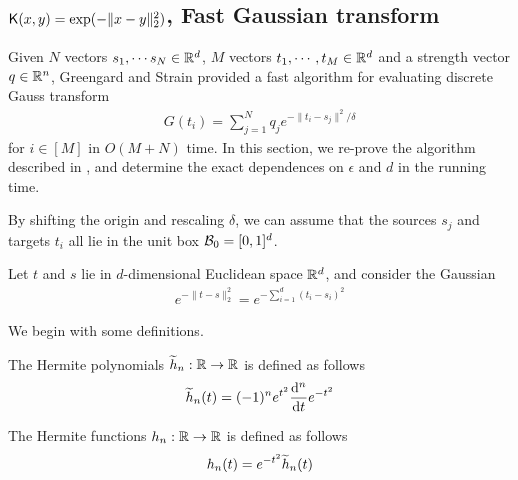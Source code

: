 \subsection{\texorpdfstring{$\mathsf{K} (x,y) = \exp ( -  \| x - y \|_2^2 ) $}{}, Fast Gaussian transform}\label{sec:fastmm_gaussian_kernel}

Given $N$ vectors $s_1, \cdots s_N \in {\mathbb R}^d$, $M$ vectors $t_1, \cdots, t_M \in {\mathbb R}^d$ and a strength vector $q \in {\mathbb R}^n$, Greengard and Strain \cite{gs91} provided a fast algorithm for evaluating discrete Gauss transform
\begin{align*}
G(t_i) = \sum_{j=1}^N q_j e^{ - \| t_i - s_j \|^2 / \delta }
\end{align*}
for $i \in [M]$ in $O(M+N)$ time. In this section, we re-prove the algorithm described in \cite{gs91}, and determine the exact dependences on $\epsilon$ and $d$ in the running time.



By shifting the origin and rescaling $\delta$, we can assume that the sources $s_j$ and targets $t_i$ all lie in the unit box ${\cal B}_0 = [0,1]^d$. 

Let $t$ and $s$ lie in $d$-dimensional Euclidean space ${\mathbb R}^d$, and consider the Gaussian 
\begin{align*}
e^{- \| t - s \|_2^2 } = e^{ - \sum_{i=1}^d (t_i - s_i)^2  }
\end{align*}


We begin with some definitions.
\begin{definition}
The Hermite polynomials $\widetilde{h}_n : {\mathbb R} \rightarrow {\mathbb R}$ is defined as follows
\begin{align*}
\widetilde{h}_n(t) = (-1)^n e^{t^2} \frac{ \mathrm{d}^n }{ \mathrm{d} t } e^{-t^2}
\end{align*}
\end{definition}

\begin{definition}
The Hermite functions $h_n : {\mathbb R} \rightarrow {\mathbb R}$ is defined as follows
\begin{align*}
h_n(t) = e^{-t^2} \widetilde{h}_n(t)
\end{align*}
\end{definition}

